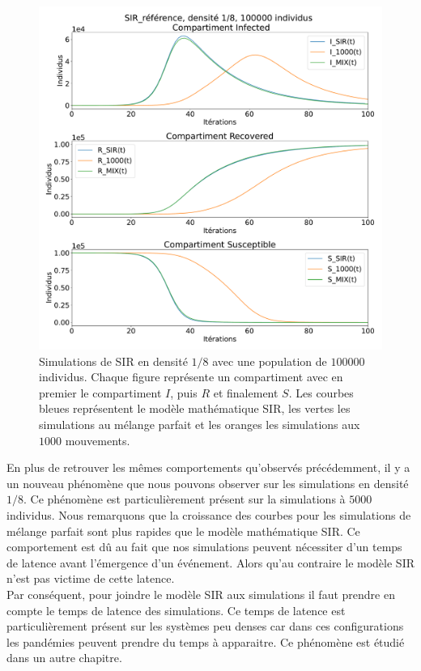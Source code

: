 \begin{figure}[h]
	\centering
	\captionsetup{justification=centering}
	\includegraphics[width=.9\textwidth]{Images/SIR_ref_8_100.pdf}
	\caption[Simulation SIR, densité $1/8$]{Simulations de SIR en densité $1/8$ avec une population de $100000$ individus. Chaque figure représente un compartiment avec en premier le compartiment $I$, puis $R$ et finalement $S$. Les courbes bleues représentent le modèle mathématique SIR, les vertes les simulations au mélange parfait et les oranges les simulations aux $1000$ mouvements.}
\end{figure}

En plus de retrouver les mêmes comportements qu'observés précédemment, il y a un nouveau phénomène que nous pouvons observer sur les simulations en densité $1/8$. Ce phénomène est particulièrement présent sur la simulations à $5000$ individus. Nous remarquons que la croissance des courbes pour les simulations de mélange parfait sont plus rapides que le modèle mathématique SIR. Ce comportement est dû au fait que nos simulations peuvent nécessiter d'un temps de latence avant l'émergence d'un événement. Alors qu'au contraire le modèle SIR n'est pas victime de cette latence.\\

Par conséquent, pour joindre le modèle SIR aux simulations il faut prendre en compte le temps de latence des simulations. Ce temps de latence est particulièrement présent sur les systèmes peu denses car dans ces configurations les pandémies peuvent prendre du temps à apparaitre. Ce phénomène est étudié dans un autre chapitre.

